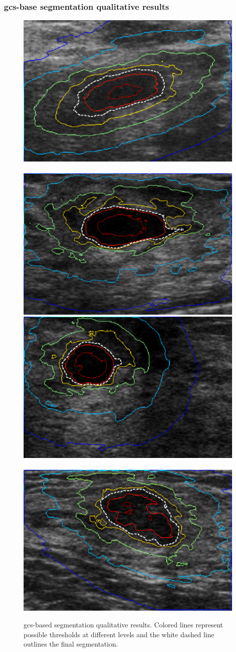 \begin{frame}[plain]\frametitle{\acs{gcs}-base segmentation qualitative results}
\begin{figure}[Htbp]
\centering
\includegraphics[height=.33\textwidth]{mscThesis/final7.png}\,
\includegraphics[height=.33\textwidth]{mscThesis/final13.png}\vspace{3pt}
\includegraphics[height=.33\textwidth]{mscThesis/final14.png}\,
\includegraphics[height=.33\textwidth]{mscThesis/final15.png}
\caption{\ac{gcs}-based segmentation qualitative results. Colored lines represent possible thresholds at different levels and the white dashed line outlines the final segmentation.}
\end{figure}
\end{frame}

